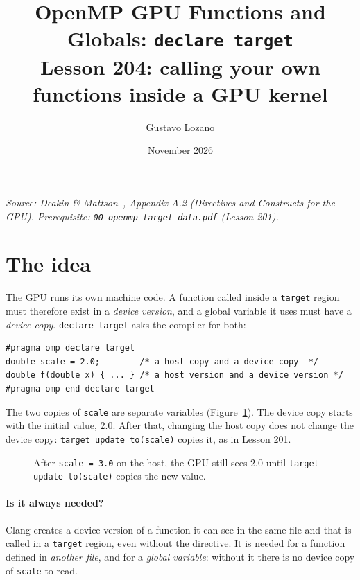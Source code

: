 \documentclass[11pt,a4paper]{article}
\title{\textbf{OpenMP GPU Functions and Globals: \texttt{declare target}}\\[4pt]\large Lesson 204: calling your own functions inside a GPU kernel}
\author{Gustavo Lozano}
\date{November 2026}
\let\origtexttt\texttt
\renewcommand{\texttt}[1]{\textcolor{black!60}{\origtexttt{#1}}}
\begin{document}
\maketitle

\noindent\textit{\small Source: Deakin \& Mattson~\cite{dm}, Appendix A.2 (Directives and
Constructs for the GPU). Prerequisite: \texttt{00-openmp\_target\_data.pdf} (Lesson 201).}

\section{The idea}
The GPU runs its own machine code. A function called inside a \texttt{target} region must
therefore exist in a \emph{device version}, and a global variable it uses must have a
\emph{device copy}. \texttt{declare target} asks the compiler for both:
\begin{lstlisting}[numbers=none]
#pragma omp declare target
double scale = 2.0;        /* a host copy and a device copy  */
double f(double x) { ... } /* a host version and a device version */
#pragma omp end declare target
\end{lstlisting}

The two copies of \texttt{scale} are separate variables (Figure~\ref{fig:copies}). The device
copy starts with the initial value, $2.0$. After that, changing the host copy does not change the
device copy: \texttt{target update to(scale)} copies it, as in Lesson 201.

\begin{figure}[H]
\centering
{}
\caption{After \texttt{scale = 3.0} on the host, the GPU still sees $2.0$ until
\texttt{target update to(scale)} copies the new value.}
\label{fig:copies}
\end{figure}

\paragraph{Is it always needed?} Clang creates a device version of a function it can see in the
same file and that is called in a \texttt{target} region, even without the directive. It is
needed for a function defined in \emph{another file}, and for a \emph{global variable}: without
it there is no device copy of \texttt{scale} to read.
\end{document}
